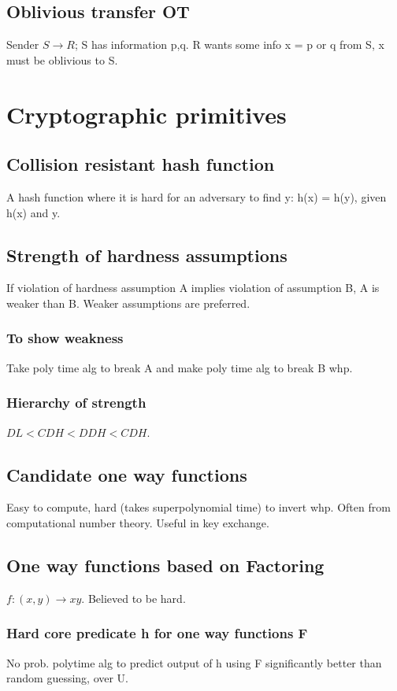 \documentclass[oneside, article]{memoir}
\begin{document}
\section{Oblivious transfer OT}
Sender $S \to R$; S has information p,q. R wants some info x = p or q from S, x must be oblivious to S. \tbc

\chapter{Cryptographic primitives}
\section{Collision resistant hash function}
A hash function where it is hard for an adversary to find y: h(x) = h(y), given h(x) and y.

\section{Strength of hardness assumptions}
If violation of hardness assumption A implies violation of assumption B, A is weaker than B. Weaker assumptions are preferred.

\subsection{To show weakness }
Take poly time alg to break A and make poly time alg to break B whp.

\subsection{Hierarchy of strength}
$DL < CDH < DDH < CDH$.

\section{Candidate one way functions}
Easy to compute, hard (takes superpolynomial time) to invert whp. Often from computational number theory. Useful in key exchange.

\section{One way functions based on Factoring}
$f: (x,y) \to xy$. Believed to be hard.

\subsection{Hard core predicate h for one way functions F}
No prob. polytime alg to predict output of h using F significantly better than random guessing, over U.
\end{document}
